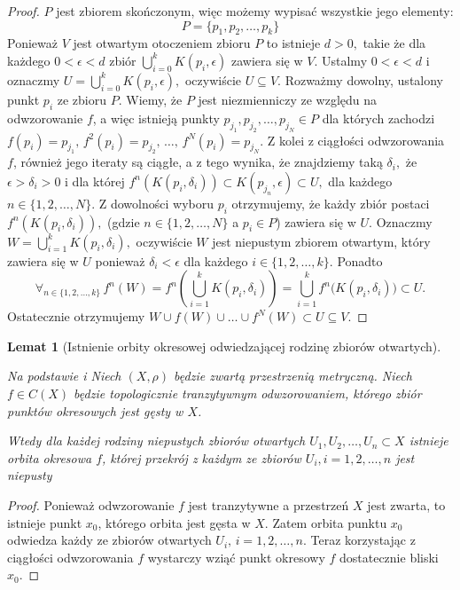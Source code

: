 \documentclass[licencjacka]{pwr_wmat_praca_dyplomowa}
\theoremstyle{plain}
\numberwithin{theorem}{chapter}
\newtheorem{lemma}[theorem]{Lemat}
\theoremstyle{definition}
\numberwithin{theorem}{chapter}
\begin{document}
\begin{proof}
$P$ jest zbiorem skończonym, więc możemy wypisać wszystkie jego elementy: 
$$P = \{p_1, p_2, \ldots, p_k\}$$
Ponieważ $V$ jest otwartym otoczeniem zbioru $P$ to istnieje $d>0,$ takie że dla każdego ${0<\epsilon<d}$ zbiór $\bigcup_{i=0}^k K(p_i, \epsilon)$ zawiera się w $V.$ Ustalmy $0<\epsilon<d$ i oznaczmy $U=\bigcup_{i=0}^k K(p_i, \epsilon),$ oczywiście $U \subseteq V.$ Rozważmy dowolny, ustalony punkt $p_i$ ze zbioru $P.$ Wiemy, że $P$ jest niezmienniczy ze względu na odwzorowanie $f$, a więc istnieją punkty $p_{j_1}, p_{j_2}, \ldots, p_{j_N} \in P$ dla których zachodzi $f(p_i) = p_{j_1}, \, f^2(p_i) = p_{j_2}, \, \ldots, \, f^N(p_i) = p_{j_N}.$ Z kolei z ciągłości odwzorowania $f$, również jego iteraty są ciągłe, a z tego wynika, że znajdziemy taką $\delta_i,$ że $\epsilon >\delta_i > 0$ i dla której $f^n(K(p_i, \delta_i)) \subset K(p_{j_n}, \epsilon) \subset U,$ dla każdego $n \in \{1,2,\ldots,N\}.$ Z dowolności wyboru $p_i$ otrzymujemy, że każdy zbiór postaci $f^n(K(p_i, \delta_i)),$ (gdzie $n \in \{1,2,\ldots,N\}$ a $p_i \in P$) zawiera się w $U$. Oznaczmy $W = \bigcup_{i=1}^k K(p_i, \delta_i),$ oczywiście $W$ jest niepustym zbiorem otwartym, który zawiera się w $U$ ponieważ $\delta_i < \epsilon$ dla każdego $i \in \{1,2,\ldots,k\}.$ Ponadto
$$\forall_{n \in \{1,2,\ldots,k\}} \, f^n(W) = f^n\left(\bigcup_{i=1}^k K(p_i, \delta_i)\right) = \bigcup_{i=1}^k f^n\big(K(p_i, \delta_i)\big) \subset U.$$
Ostatecznie otrzymujemy $W \cup f(W) \cup \ldots \cup f^N(W) \subset U \subseteq V.$
\end{proof}



\begin{lemma}[Istnienie orbity okresowej odwiedzającej rodzinę zbiorów otwartych]
\label{lemat_3_glownego_artykulu_istnieje_orbita_okresowa_krojaca_sie_z_rodzina_otwartych}

Na podstawie \cite[s.~231-232 Lemma 3]{balibrea2003topological} i \cite[s.~7]{someAspectsOfTopologicalTransitivity}
Niech $(X, \rho)$ będzie zwartą przestrzenią metryczną.
Niech $f \in C(X)$ będzie topologicznie tranzytywnym odwzorowaniem, którego zbiór punktów okresowych jest gęsty w $X$. 

Wtedy dla każdej rodziny niepustych zbiorów otwartych $U_1, U_2, \ldots, U_n \subset X$ istnieje orbita okresowa $f$, której przekrój z każdym ze zbiorów $U_i, i=1,2,\ldots,n$ jest niepusty
\end{lemma}

\begin{proof}
Ponieważ odwzorowanie $f$ jest tranzytywne a przestrzeń $X$ jest zwarta, to istnieje punkt $x_0$, którego orbita jest gęsta w $X$. Zatem orbita punktu $x_0$ odwiedza każdy ze zbiorów otwartych $U_i, \, i = 1,2,\ldots,n.$ Teraz korzystając z ciągłości odwzorowania $f$ wystarczy wziąć punkt okresowy $f$ dostatecznie bliski $x_0.$
\end{proof}
\end{document}
